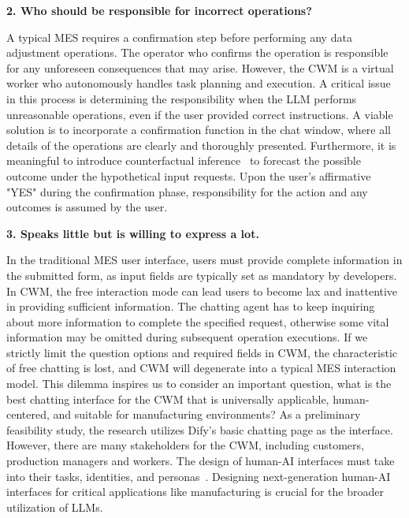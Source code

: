 \documentclass[preprint,12pt]{elsarticle}
\begin{document}
\textbf{2. Who should be responsible for incorrect operations?}

A typical MES requires a confirmation step before performing any data adjustment operations.
The operator who confirms the operation is responsible for any unforeseen consequences that may arise.
However, the CWM is a virtual worker who autonomously handles task planning and execution.
A critical issue in this process is determining the responsibility when the LLM performs unreasonable operations, even if the user provided correct instructions.
A viable solution is to incorporate a confirmation function in the chat window, where all details of the operations are clearly and thoroughly presented. 
Furthermore, it is meaningful to introduce counterfactual inference~\cite{del2024generating} to forecast the possible outcome under the hypothetical input requests.
Upon the user's affirmative "YES" during the confirmation phase, responsibility for the action and any outcomes is assumed by the user.

\textbf{3. Speaks little but is willing to express a lot.}

In the traditional MES user interface, users must provide complete information in the submitted form, as input fields are typically set as mandatory by developers.
In CWM, the free interaction mode can lead users to become lax and inattentive in providing sufficient information.
The chatting agent has to keep inquiring about more information to complete the specified request, otherwise some vital information may be omitted during subsequent operation executions.
If we strictly limit the question options and required fields in CWM, the characteristic of free chatting is lost, and CWM will degenerate into a typical MES interaction model.
This dilemma inspires us to consider an important question, what is the best chatting interface for the CWM that is universally applicable, human-centered, and suitable for manufacturing environments?
As a preliminary feasibility study, the research utilizes Dify's basic chatting page as the interface.
However, there are many stakeholders for the CWM, including customers, production managers and workers.
The design of human-AI interfaces must take into their tasks, identities, and personas~\cite{holzinger2022personas}.
Designing next-generation human-AI interfaces for critical applications like manufacturing is crucial for the broader utilization of LLMs.
\end{document}
